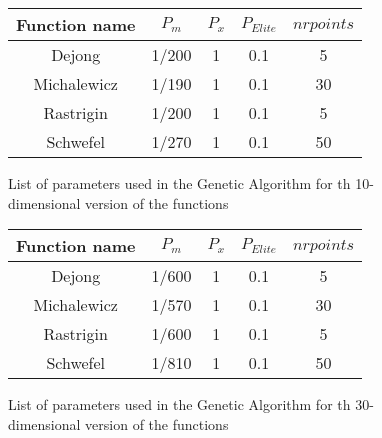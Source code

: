 \documentclass{article}
\begin{document}
\begin{figure}[H]
	\begin{tabular}{|c||c|c|c|c|} \hline
		Function name & $P_m$ & $P_x$ & $P_{Elite}$ &  $nrpoints$\\ \hline \hline
		Dejong & 1/200 & 1 & 0.1 & 5 \\ \hline
		Michalewicz & 1/190 & 1 & 0.1 & 30\\ \hline
		Rastrigin & 1/200 & 1 & 0.1 & 5 \\ \hline
		Schwefel & 1/270 & 1 & 0.1 & 50 \\ \hline
\end{tabular}
\caption{List of parameters used in the Genetic Algorithm for th 10-dimensional version of the functions}
\end{figure}

\begin{figure}[H]
	\begin{tabular}{|c||c|c|c|c|} \hline
		Function name & $P_m$ & $P_x$ & $P_{Elite}$ &  $nrpoints$\\ \hline \hline
		Dejong & 1/600 & 1 & 0.1 & 5 \\ \hline
		Michalewicz & 1/570 & 1 & 0.1 & 30\\ \hline
		Rastrigin & 1/600 & 1 & 0.1 & 5 \\ \hline
		Schwefel & 1/810 & 1 & 0.1 & 50 \\ \hline
\end{tabular}
\caption{List of parameters used in the Genetic Algorithm for th 30-dimensional version of the functions}
\end{figure}
\end{document}
